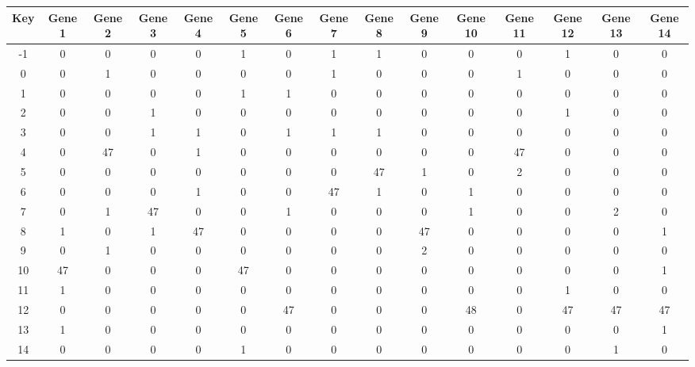 \begin{tabular}{|c|c|c|c|c|c|c|c|c|c|c|c|c|c|c|}
\hline
Key & Gene 1 & Gene 2 & Gene 3 & Gene 4 & Gene 5 & Gene 6 & Gene 7 & Gene 8 & Gene 9 & Gene 10 & Gene 11 & Gene 12 & Gene 13 & Gene 14 \\
\hline
-1 & 0 & 0 & 0 & 0 & 1 & 0 & 1 & 1 & 0 & 0 & 0 & 1 & 0 & 0 \\
0 & 0 & 1 & 0 & 0 & 0 & 0 & 1 & 0 & 0 & 0 & 1 & 0 & 0 & 0 \\
1 & 0 & 0 & 0 & 0 & 1 & 1 & 0 & 0 & 0 & 0 & 0 & 0 & 0 & 0 \\
2 & 0 & 0 & 1 & 0 & 0 & 0 & 0 & 0 & 0 & 0 & 0 & 1 & 0 & 0 \\
3 & 0 & 0 & 1 & 1 & 0 & 1 & 1 & 1 & 0 & 0 & 0 & 0 & 0 & 0 \\
4 & 0 & 47 & 0 & 1 & 0 & 0 & 0 & 0 & 0 & 0 & 47 & 0 & 0 & 0 \\
5 & 0 & 0 & 0 & 0 & 0 & 0 & 0 & 47 & 1 & 0 & 2 & 0 & 0 & 0 \\
6 & 0 & 0 & 0 & 1 & 0 & 0 & 47 & 1 & 0 & 1 & 0 & 0 & 0 & 0 \\
7 & 0 & 1 & 47 & 0 & 0 & 1 & 0 & 0 & 0 & 1 & 0 & 0 & 2 & 0 \\
8 & 1 & 0 & 1 & 47 & 0 & 0 & 0 & 0 & 47 & 0 & 0 & 0 & 0 & 1 \\
9 & 0 & 1 & 0 & 0 & 0 & 0 & 0 & 0 & 2 & 0 & 0 & 0 & 0 & 0 \\
10 & 47 & 0 & 0 & 0 & 47 & 0 & 0 & 0 & 0 & 0 & 0 & 0 & 0 & 1 \\
11 & 1 & 0 & 0 & 0 & 0 & 0 & 0 & 0 & 0 & 0 & 0 & 1 & 0 & 0 \\
12 & 0 & 0 & 0 & 0 & 0 & 47 & 0 & 0 & 0 & 48 & 0 & 47 & 47 & 47 \\
13 & 1 & 0 & 0 & 0 & 0 & 0 & 0 & 0 & 0 & 0 & 0 & 0 & 0 & 1 \\
14 & 0 & 0 & 0 & 0 & 1 & 0 & 0 & 0 & 0 & 0 & 0 & 0 & 1 & 0 \\
\hline
\end{tabular}